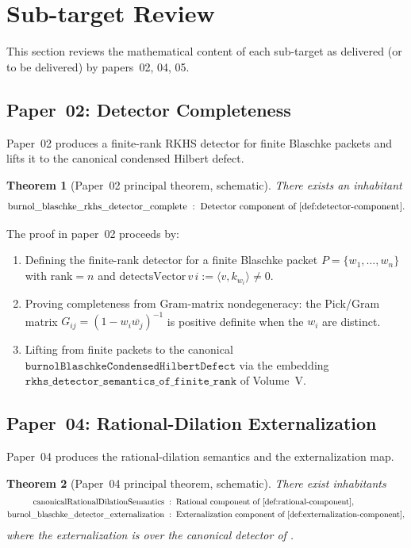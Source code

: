 \documentclass[12pt]{article}
\theoremstyle{plain}
\newtheorem{theorem}{Theorem}[section]
\theoremstyle{definition}
\theoremstyle{remark}
\begin{document}
\section{Sub-target Review}
\label{sec:subtarget-review}

This section reviews the mathematical content of each sub-target as
delivered (or to be delivered) by papers~02, 04, 05.

\subsection{Paper~02: Detector Completeness}
\label{sec:paper02-review}

Paper~02 produces a finite-rank RKHS detector for finite Blaschke
packets and lifts it to the canonical condensed Hilbert defect.

\begin{theorem}[Paper~02 principal theorem, schematic]
\label{thm:paper02}
There exists an inhabitant
\[
  \mathrm{burnol\_blaschke\_rkhs\_detector\_complete}
  \;:\; \text{Detector component of \Cref{def:detector-component}}.
\]
\end{theorem}

The proof in paper~02 proceeds by:
\begin{enumerate}
  \item Defining the finite-rank detector for a finite Blaschke packet
        \(P = \{w_{1},\ldots,w_{n}\}\) with \(\mathrm{rank} = n\) and
        \(\mathrm{detectsVector}\,v\,i := \langle v, k_{w_{i}}\rangle \neq 0\).
  \item Proving completeness from Gram-matrix nondegeneracy: the
        Pick/Gram matrix \(G_{ij} = (1 - w_{i}\overline{w_{j}})^{-1}\)
        is positive definite when the \(w_{i}\) are distinct.
  \item Lifting from finite packets to the canonical
        \(\mathtt{burnolBlaschkeCondensedHilbertDefect}\) via the
        embedding \(\mathtt{rkhs\_detector\_semantics\_of\_finite\_rank}\)
        of Volume~V.
\end{enumerate}

\subsection{Paper~04: Rational-Dilation Externalization}
\label{sec:paper04-review}

Paper~04 produces the rational-dilation semantics and the
externalization map.

\begin{theorem}[Paper~04 principal theorem, schematic]
\label{thm:paper04}
There exist inhabitants
\begin{align*}
  \mathrm{canonicalRationalDilationSemantics}
   &\;:\; \text{Rational component of \Cref{def:rational-component}}, \\
  \mathrm{burnol\_blaschke\_detector\_externalization}
   &\;:\; \text{Externalization component of \Cref{def:externalization-component}},
\end{align*}
where the externalization is over the canonical detector of
.
\end{theorem}
\end{document}
